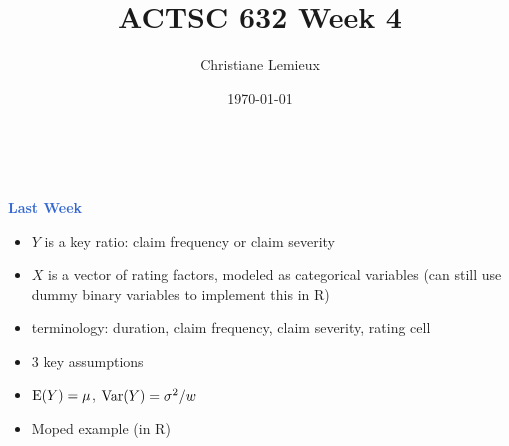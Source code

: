 \documentclass[aspectratio=169,professionalfonts,mathserif,handout]{beamer}
\title{ACTSC 632 Week 4}
\author{Christiane Lemieux}
\date{\today}
\newcommand{\highlight}[1]{\textcolor{Highlight}{\bf #1}}
\renewcommand{\(}{\left(}
\renewcommand{\)}{\right)}
\renewcommand{\[}{\left[}
\renewcommand{\]}{\right]}
\newcommand{\mytitle}[1]{\vspace*{-1mm}%
  \centerline{\highlight{\Large #1}}\vspace*{3mm}}
\newenvironment{slidebox}{%
  \begin{minipage}[c][7.5cm][t]{14.4cm}\raggedright}{%
  \end{minipage}}
\begin{document}

\begin{frame}
  \begin{slidebox}
    
    \vspace{7mm}
    \begin{center}
    \end{center}
    
    \vspace{6mm}
    
    \begin{center}
      \onslide<1>{%
      \highlight{\large Data Science with Actuarial Applications}\\[3mm]}
       \\[6mm]
    \end{center}
    
\end{slidebox}\end{frame}

\begin{frame}\begin{slidebox}
\mytitle{Last Week}

\begin{itemize}
    \item $Y$ is a key ratio: claim frequency or claim severity
    \pause
    \item $X$ is a vector of rating factors, modeled as categorical variables (can still use dummy binary variables to implement this in R)
    \pause
    \item terminology: duration, claim frequency, claim severity, rating cell
    \pause
    \item 3 key assumptions
    \pause
    \item ${\rm E}(Y) = \mu$, ${\rm Var}(Y) = \sigma^2/w$
    \pause
    \item Moped example (in R)
\end{itemize}
\end{slidebox}\end{frame}
\end{document}

